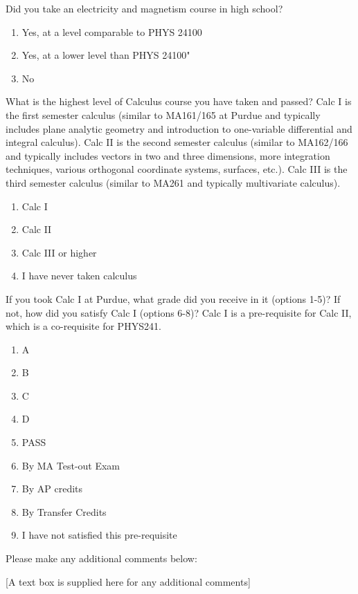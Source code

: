 Did you take an electricity and magnetism course in high school?

\begin{enumerate}
	\item Yes, at a level comparable to PHYS 24100
	\item Yes, at a lower level than PHYS 24100"
	\item No
\end{enumerate}

What is the highest level of Calculus course you have taken and passed? Calc I is the first semester calculus (similar to MA161/165 at Purdue and typically includes plane analytic geometry and introduction to one-variable differential and integral calculus). Calc II is the second semester calculus (similar to MA162/166 and typically includes vectors in two and three dimensions, more integration techniques, various orthogonal coordinate systems, surfaces, etc.). Calc III is the third semester calculus (similar to MA261 and typically multivariate calculus).

\begin{enumerate}
	\item Calc I
	\item Calc II
	\item Calc III or higher
	\item I have never taken calculus
\end{enumerate}

If you took Calc I at Purdue, what grade did you receive in it (options 1-5)? If not, how did you satisfy Calc I (options 6-8)? Calc I is a pre-requisite for Calc II, which is a co-requisite for PHYS241.

\begin{enumerate}
	\item A
	\item B
	\item C
	\item D
	\item PASS
	\item By MA Test-out Exam
	\item By AP credits
	\item By Transfer Credits
	\item I have not satisfied this pre-requisite
\end{enumerate}

Please make any additional comments below:

[A text box is supplied here for any additional comments]
